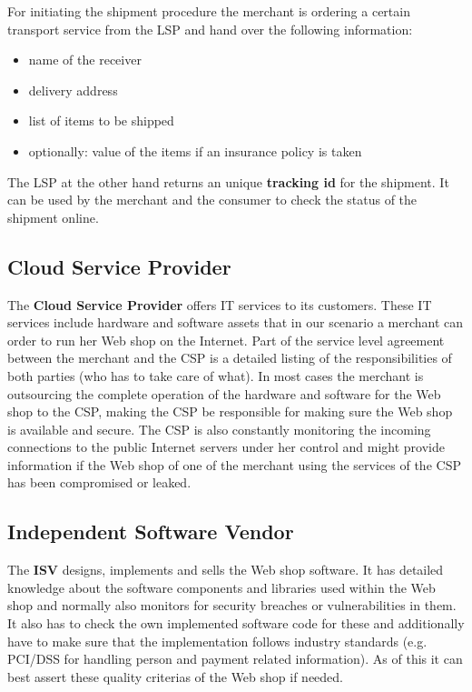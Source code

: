 For initiating the shipment procedure the merchant is ordering a certain transport service from the \gls{LSP} and hand over the following information:\@

\begin{itemize}
	\item name of the receiver
	\item delivery address
	\item list of items to be shipped
	\item optionally: value of the items if an insurance policy is taken
\end{itemize}

The \gls{LSP} at the other hand returns an unique \textbf{tracking id} for the shipment. It can be used by the merchant and the consumer to check the status of the shipment online.


\subsection{Cloud Service Provider}
\label{subsec:stakeholder_csp}

The \textbf{Cloud Service Provider} offers IT services to its customers. These IT services include hardware and software assets that in our scenario a merchant can order to run her Web shop on the Internet. Part of the service level agreement between the merchant and the \gls{CSP} is a detailed listing of the responsibilities of both parties (who has to take care of what). In most cases the merchant is outsourcing the complete operation of the hardware and software for the Web shop to the \gls{CSP}, making the \gls{CSP} be responsible for making sure the Web shop is available and secure. The \gls{CSP} is also constantly monitoring the incoming connections to the public Internet servers under her control and might provide information if the Web shop of one of the merchant using the services of the \gls{CSP} has been compromised or leaked.


\subsection{Independent Software Vendor}
\label{subsec:stakeholder_isv}

The \textbf{ISV} designs, implements and sells the Web shop software. It has detailed knowledge about the software components and libraries used within the Web shop and normally also monitors for security breaches or vulnerabilities in them. It also has to check the own implemented software code for these and additionally have to make sure that the implementation follows industry standards (e.g. PCI/DSS for handling person and payment related information). As of this it can best assert these quality criterias of the Web shop if needed.

